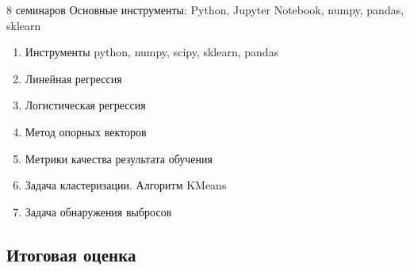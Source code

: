 \documentclass{beamer}
\begin{document}
\begin{frame}{8 семинаров}
    Основные инструменты: Python, Jupyter Notebook, numpy, pandas, sklearn
    \begin{enumerate}
        \item Инструменты python, numpy, scipy, sklearn, pandas
        \item Линейная регрессия
        \item Логистическая регрессия
        \item Метод опорных векторов
        \item Метрики качества результата обучения
        \item Задача кластеризации. Алгоритм KMeans
        \item Задача обнаружения выбросов
    \end{enumerate}
\end{frame}


\subsection{Итоговая оценка}
\end{document}

